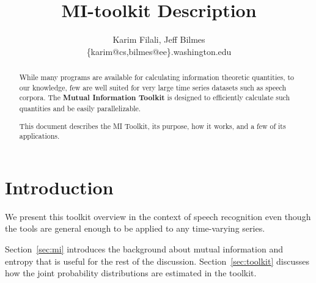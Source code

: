 \documentclass{article}
\title{MI-toolkit Description}
\author{Karim Filali, Jeff Bilmes\\ \{karim@cs,bilmes@ee\}.washington.edu}
\begin{document}
\maketitle

\begin{abstract}
While many programs are available for calculating information
theoretic quantities, to our knowledge, few are well suited for very
large time series datasets such as speech corpora.  The {\bf Mutual
Information Toolkit} is designed to efficiently calculate such
quantities and be easily parallelizable.

This document describes the MI Toolkit, its purpose,
how it works, and a few of its applications.   
\end{abstract}

\section{Introduction}



We present this toolkit overview in the context of speech recognition
even though the tools are general enough to be applied to any
time-varying series.

Section~\ref{sec:mi} introduces the background about mutual
information and entropy that is useful for the rest of the discussion.
Section~\ref{sec:toolkit} discusses how the joint probability
distributions are estimated in the toolkit.


\end{document}
